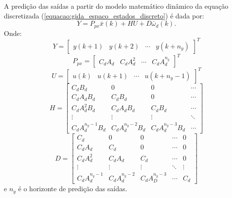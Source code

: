 	A predição das saídas a partir do modelo matemático dinâmico da equação discretizada (\ref{equacao:gida_espaco_estados_discreto}) é dada por:
	\begin{equation}
		\label{equacao:predicao_saidas}
		Y=P_{px}\bar{x}(k)+HU+D\bar{\omega}_d(k).
	\end{equation}
	Onde:
	\begin{equation}
		\label{equacao:predicao_Y}
		Y = 
		\begin{bmatrix}
			y(k+1) & y(k+2) & \cdots & y(k+n_y)
		\end{bmatrix}^T 
	\end{equation}
	\begin{equation}
		\label{equacao:predicao_P}
		P_{px} = 
		\begin{bmatrix}
			C_dA_d & C_dA_d^2 & \cdots & C_dA_d^{n_y}
		\end{bmatrix}^T
	\end{equation}
	\begin{equation}
		\label{equacao:predicao_U}
		U = 
		\begin{bmatrix}
			u(k) & u(k+1) & \cdots & u(k+n_y-1)
		\end{bmatrix}^T	
	\end{equation}
	\begin{equation}
		\label{equacao:predicao_H}
		H = 
		\begin{bmatrix}
			C_dB_d            & 0                 & 0                 & \cdots \\
			C_dA_dB_d         & C_dB_d            & 0                 & \cdots \\
			C_dA_d^2B_d       & C_dA_dB_d         & C_dB_d            & \cdots \\
			\vdots            & \vdots            & \vdots            & \ddots \\
			C_dA_d^{n_y-1}B_d & C_dA_d^{n_y-2}B_d & C_dA_d^{n_y-3}B_d & \cdots
		\end{bmatrix}
	\end{equation}
	\begin{equation}
		\label{equacao:predicao_D}
		D = 
		\begin{bmatrix}
			C_d            & 0              & 0              & \cdots & 0      \\
			C_dA_d         & C_d            & 0              & \cdots & 0      \\
			C_dA_d^2       & C_dA_d         & C_d            & \cdots & 0      \\
			\vdots         & \vdots         & \vdots         & \ddots & \vdots \\
			C_dA_d^{n_y-1} & C_dA_d^{n_y-2} & C_dA_D^{n_y-3} & \cdots & C_d
		\end{bmatrix}
	\end{equation}
	e $n_y$ é o horizonte de predição das saídas. 
	
